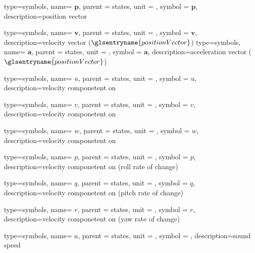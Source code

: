 {type=symbols,
  name= \ensuremath{\mathbf{p}},
  parent = {states},
  unit = \unexpanded{\si{\meter}},
  symbol = \ensuremath{\mathbf{p}},
  description={position vector}
}

{type=symbols,
  name= \ensuremath{\mathbf{v}},
  parent = {states},
  unit = \unexpanded{\si{\meter\per\second}},
  symbol = \ensuremath{\mathbf{v}},
  description={velocity vector ($\dot{\glsentryname{positionVector}}$)}
}
{type=symbols,
  name= \ensuremath{\mathbf{a}},
  parent = {states},
  unit = \unexpanded{\si{\meter\per\second\squared}},
  symbol = \ensuremath{\mathbf{a}},
  description={acceleration vector ($\ddot{\glsentryname{positionVector}}$)}
}


{type=symbols,
  name= \ensuremath{u},
  parent = {states},
  unit = \unexpanded{\si{\meter\per\second}},
  symbol = \ensuremath{u},
  description={velocity componetent on }
}

{type=symbols,
  name= \ensuremath{v},
  parent = {states},
  unit = \unexpanded{\si{\meter\per\second}},
  symbol = \ensuremath{v},
  description={velocity componetent on }
}

{type=symbols,
  name= \ensuremath{w},
  parent = {states},
  unit = \unexpanded{\si{\meter\per\second}},
  symbol = \ensuremath{w},
  description={velocity componetent on }
}

{type=symbols,
  name= \ensuremath{p},
  parent = {states},
  unit = \unexpanded{\si{\radian\per\second}},
  symbol = \ensuremath{p},
  description={velocity componetent on  (roll rate of change)}
}

{type=symbols,
  name= \ensuremath{q},
  parent = {states},
  unit = \unexpanded{\si{\radian\per\second}},
  symbol = \ensuremath{q},
  description={velocity componetent on  (pitch rate of change)}
}

{type=symbols,
  name= \ensuremath{r},
  parent = {states},
  unit = \unexpanded{\si{\radian\per\second}},
  symbol = \ensuremath{r},
  description={velocity componetent on  (yaw rate of change)}
}

{type=symbols,
  name= \ensuremath{a},
  parent = {states},
  unit = \unexpanded{\si{\meter\per\second}},
  symbol = ,
  description={sound speed}
}

